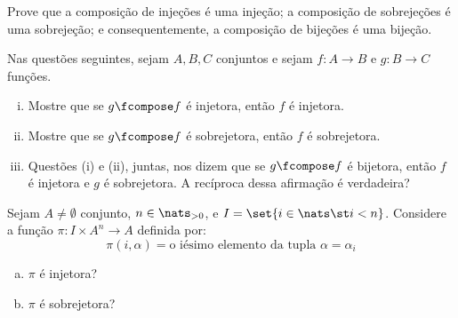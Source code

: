 \begin{exercise}
Prove que a composição de injeções é uma injeção; a composição de sobrejeções é uma sobrejeção; e consequentemente, a composição de bijeções é uma bijeção.
\end{exercise}

\begin{exercise}
Nas questões seguintes, sejam $A,B,C$ conjuntos e sejam $f:A \to B$ e $g:B \to C$ funções.
\begin{enumerate}[(i)]
    \item Mostre que se $g \fcompose f$ é injetora, então $f$ é injetora.
    \item Mostre que se $g \fcompose f$ é sobrejetora, então $f$ é sobrejetora.
    \item Questões (i) e (ii), juntas, nos dizem que se $g \fcompose f$ é bijetora, então $f$ é injetora e $g$ é sobrejetora. A recíproca dessa afirmação é verdadeira?
\end{enumerate}
\end{exercise}

\begin{exercise}
    Sejam $A \not = \emptyset$ conjunto, $n \in \nats_{>0}$, e $I = \set{i \in \nats \st i < n}$. Considere a função $\pi : I \times A^n \to A$ definida por:
    $$
        \pi (i, \alpha) = \text{o iésimo elemento da tupla } \alpha = \alpha_i
    $$

    \begin{enumerate}[(a)]
        \item $\pi$ é injetora?
        \item $\pi$ é sobrejetora?
    \end{enumerate}
\end{exercise}

